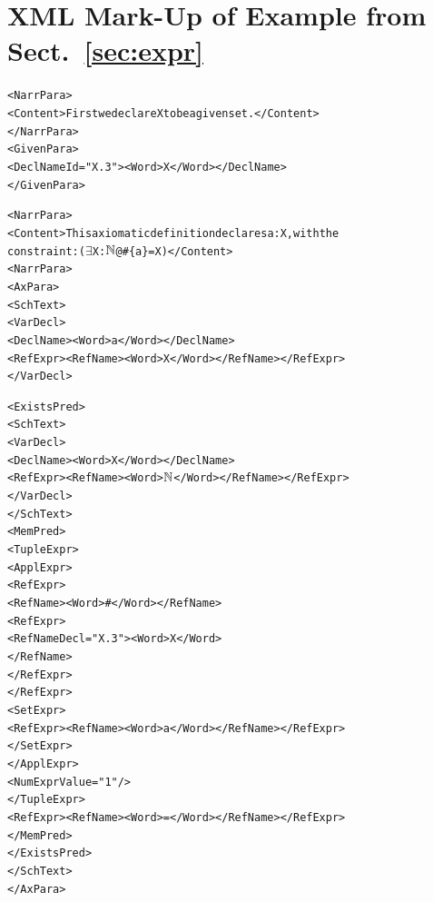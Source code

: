 \documentclass{llncs}  %
\begin{document}
\section{XML Mark-Up of Example from Sect.~\ref{sec:expr}}
\newcommand{\NAT}{$\nat$}
\newcommand{\EXISTS}{$\exists$}
\begin{small}
\begin{alltt}
  <NarrPara>
    <Content>First we declare X to be a given set.</Content>
  </NarrPara>
  <GivenPara>
    <DeclName Id="X.3"> <Word>X</Word> </DeclName>
  </GivenPara>

  <NarrPara>
    <Content>This axiomatic definition declares a:X, with the
    constraint: (\EXISTS X:\NAT @ #\{a\} = X)</Content>
  <NarrPara>
  <AxPara>
    <SchText>
      <VarDecl>
        <DeclName> <Word>a</Word> </DeclName>
        <RefExpr><RefName><Word>X</Word></RefName></RefExpr>
      </VarDecl>

      <ExistsPred>
        <SchText>
          <VarDecl>
            <DeclName> <Word>X</Word> </DeclName>
            <RefExpr><RefName><Word>\NAT</Word></RefName></RefExpr>
          </VarDecl>
        </SchText>
        <MemPred>
          <TupleExpr>
            <ApplExpr>
              <RefExpr>
                <RefName><Word>#</Word></RefName>
                <RefExpr>
                  <RefName Decl="X.3"> <Word>X</Word>
                  </RefName>
                </RefExpr>
              </RefExpr>
              <SetExpr>
                <RefExpr><RefName><Word>a</Word></RefName></RefExpr>
              </SetExpr>
            </ApplExpr>
            <NumExpr Value="1"/>
          </TupleExpr>
          <RefExpr><RefName><Word>=</Word></RefName></RefExpr>
        </MemPred>
      </ExistsPred>
    </SchText>
  </AxPara>
\end{alltt}
\end{small}
\end{document}
